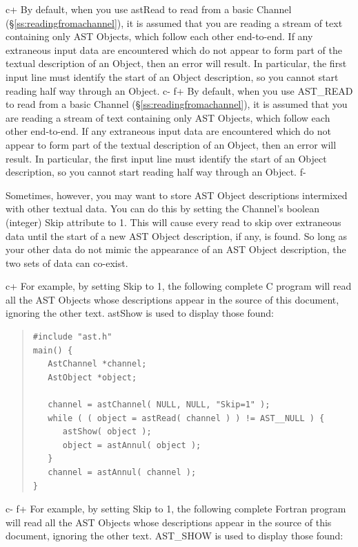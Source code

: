 \documentclass[twoside,11pt]{article}
\newcommand{\secref}[1]{\S\ref{#1}}
\newcommand{\secref}[1]{\ref{#1}}
\begin{document}
c+
By default, when you use astRead to read from a basic Channel
(\secref{ss:readingfromachannel}), it is assumed that you are reading a
stream of text containing only AST Objects, which follow each other
end-to-end. If any extraneous input data are encountered which do not
appear to form part of the textual description of an Object, then an
error will result. In particular, the first input line must identify
the start of an Object description, so you cannot start reading half
way through an Object.
c-
f+
By default, when you use AST\_READ to read from a basic Channel
(\secref{ss:readingfromachannel}), it is assumed that you are reading a
stream of text containing only AST Objects, which follow each other
end-to-end. If any extraneous input data are encountered which do not
appear to form part of the textual description of an Object, then an
error will result. In particular, the first input line must identify
the start of an Object description, so you cannot start reading half
way through an Object.
f-

Sometimes, however, you may want to store AST Object descriptions
intermixed with other textual data. You can do this by setting the
Channel's boolean (integer) Skip attribute to 1. This will cause every
read to skip over extraneous data until the start of a new AST Object
description, if any, is found. So long as your other data do not mimic
the appearance of an AST Object description, the two sets of data can
co-exist.

c+
For example, by setting Skip to 1, the following complete C program
will read all the AST Objects whose descriptions appear in the source
of this document, ignoring the other text. astShow is used to display
those found:

\begin{quote}
\small
\begin{verbatim}
#include "ast.h"
main() {
   AstChannel *channel;
   AstObject *object;

   channel = astChannel( NULL, NULL, "Skip=1" );
   while ( ( object = astRead( channel ) ) != AST__NULL ) {
      astShow( object );
      object = astAnnul( object );
   }
   channel = astAnnul( channel );
}
\end{verbatim}
\normalsize
\end{quote}
c-
f+
For example, by setting Skip to 1, the following complete Fortran
program will read all the AST Objects whose descriptions appear in the
source of this document, ignoring the other text. AST\_SHOW is used to
display those found:
\end{document}
